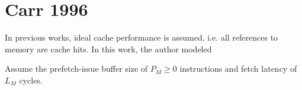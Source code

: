 \chapter{Carr 1996}
\label{note:carr-1996}

In previous works, ideal cache performance is assumed, i.e. all references to
memory are cache hits. In this work, the author modeled 

Assume the prefetch-issue buffer size of $P_{M} \ge 0$ instructions and fetch
latency of $L_{M}$ cycles.
